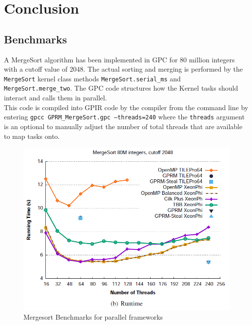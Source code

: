 \chapter{Conclusion}

\section{Benchmarks}

A MergeSort algorithm has been implemented in GPC for 80 million integers with a cutoff value 
of 2048. The actual sorting and merging is performed by the \texttt{MergeSort} kernel class
methods \texttt{MergeSort.serial\_ms} and \texttt{MergeSort.merge\_two}. The GPC code structures
how the Kernel tasks should interact and calls them in parallel.\\ 



This code is compiled into GPIR code by the compiler from the command line by entering \texttt{gpcc GPRM\_MergeSort.gpc --threads=240}
where the \texttt{threads} argument is an optional to manually adjust the number of total threads that are available
to map tasks onto.

\newpage

\begin{figure}[!htb]
\includegraphics{graphs/benchmark.png}
\caption{Mergesort Benchmarks for parallel frameworks \cite{GPRMBench}}
\label{fig:bench}
\end{figure}

